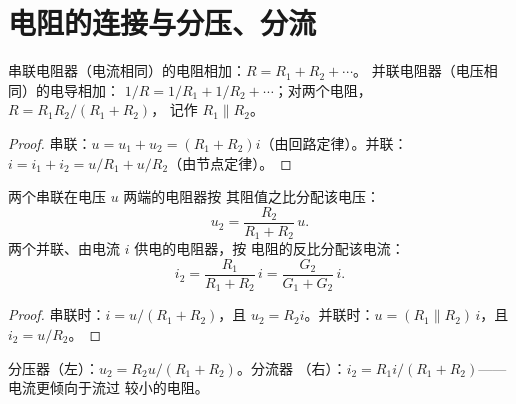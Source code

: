 \section{电阻的连接与分压、分流}

\begin{proposition}[串联与并联电阻器]\label{prop:b1:dc-circuits:seriesparallel}
串联电阻器（电流相同）的电阻相加：$R = R_1 + R_2 + \cdots$。
并联电阻器（电压相同）的电导相加：
$1/R = 1/R_1 + 1/R_2 + \cdots$；对两个电阻，$R = R_1R_2/(R_1 + R_2)$，
记作 $R_1 \parallel R_2$。
\end{proposition}

\begin{proof}
串联：$u = u_1 + u_2 = (R_1 + R_2)i$（由回路定律）。并联：$i = i_1 +
i_2 = u/R_1 + u/R_2$（由节点定律）。
\end{proof}

\begin{proposition}[分压器与分流器]\label{prop:b1:dc-circuits:dividers}
两个串联在电压 $u$ 两端的电阻器按
其阻值之比分配该电压：
\[
u_2 = \frac{R_2}{R_1 + R_2}\,u .
\]
两个并联、由电流 $i$ 供电的电阻器，按
电阻的反比分配该电流：
\[
i_2 = \frac{R_1}{R_1 + R_2}\,i = \frac{G_2}{G_1 + G_2}\,i .
\]
\end{proposition}

\begin{proof}
串联时：$i = u/(R_1 + R_2)$，且 $u_2 = R_2 i$。并联时：$u = (R_1
\parallel R_2)\,i$，且 $i_2 = u/R_2$。
\end{proof}

\begin{omfigure}

{\small 分压器（左）：$u_2 = R_2 u/(R_1 + R_2)$。分流器
（右）：$i_2 = R_1 i/(R_1 + R_2)$——电流更倾向于流过
较小的电阻。}
\end{omfigure}

